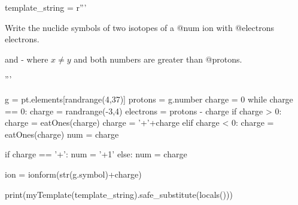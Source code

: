 


\begin{pycode}

template_string = r'''

Write the nuclide symbols of two isotopes of a @num ion with @electrons electrons.

\begin{solution}
 and  - where $x\neq y$ and both numbers are greater than @protons.

\vspace{2\baselineskip}
\end{solution}
'''

g = pt.elements[randrange(4,37)]
protons = g.number
charge = 0
while charge == 0:
	charge = randrange(-3,4)
electrons = protons - charge
if charge > 0:
	charge = eatOnes(charge)
	charge = '+'+charge
elif charge < 0: 
	charge = eatOnes(charge)
	num = charge
	
if charge == '+':
	num = '+1'
else:
	num = charge

ion = ionform(str(g.symbol)+charge)

print(myTemplate(template_string).safe_substitute(locals()))

	
\end{pycode}





